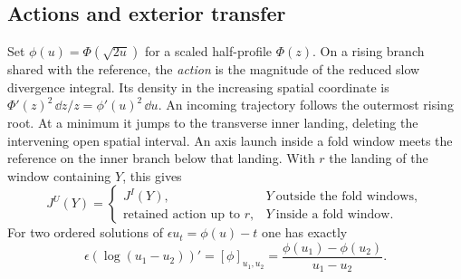 \subsection{Actions and exterior transfer}
Set $\phi(u)=\Phi(\sqrt{2u})$ for a scaled half-profile $\Phi(z)$.
On a rising branch shared with the reference, the \emph{action} is the
magnitude of the reduced slow divergence integral. Its density in the
increasing spatial coordinate is $\Phi'(z)^2\,\dd z/z=\phi'(u)^2\,\dd u$. An incoming trajectory follows the
outermost rising root. At a minimum it jumps to the transverse inner
landing, deleting the intervening open spatial interval. An axis launch
inside a fold window meets the reference on the inner branch below that
landing. With $r$ the landing of the window containing $Y$, this gives
\begin{equation}\label{eq:JU-def}
 J^U(Y)=
 \begin{cases}
  J^I(Y),&Y\ \text{outside the fold windows},\\
  \text{retained action up to }r,&Y\ \text{inside a fold window}.
 \end{cases}
\end{equation}
For two ordered solutions of $\epsilon u_t=\phi(u)-t$ one has exactly
\begin{equation}\label{eq:secant-exact}
 \epsilon(\log(u_1-u_2))'=[\phi]_{u_1,u_2}
     =\frac{\phi(u_1)-\phi(u_2)}{u_1-u_2}.
\end{equation}

